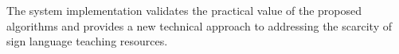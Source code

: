 \begin{abstract*}
The system implementation validates the practical value of the proposed algorithms and provides a new technical approach to addressing the scarcity of sign language teaching resources.

\end{abstract*}

